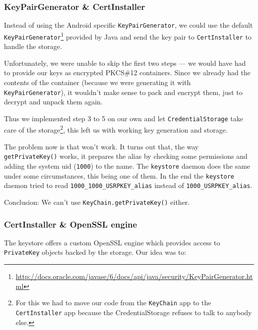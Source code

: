 \documentclass[a4paper]{scrartcl}
\begin{document}
		\subsubsection{KeyPairGenerator \& CertInstaller}
			Instead of using the Android specific \texttt{KeyPairGenerator}, we could use the default \texttt{KeyPairGenerator}\footnote{\url{http://docs.oracle.com/javase/6/docs/api/java/security/KeyPairGenerator.html}} provided by Java and send the key pair to \texttt{CertInstaller} to handle the storage.

			Unfortunately, we were unable to skip the first two steps --- we would have had to provide our keys as encrypted PKCS\#12 containers. Since we already had the contents of the container (because we were generating it with \texttt{KeyPairGenerator}), it wouldn't make sense to pack and encrypt them, just to decrypt and unpack them again.

			Thus we implemented step 3 to 5 on our own and let \texttt{CredentialStorage} take care of the storage\footnote{For this we had to move our code from the \texttt{KeyChain} app to the \texttt{CertInstaller} app because the CredentialStorage refuses to talk to anybody else.}, this left us with working key generation and storage.

			The problem now is that  won't work. It turns out that, the way \texttt{getPrivateKey()} works, it prepares the alias by checking some permissions and adding the system uid (\texttt{1000}) to the name. The \texttt{keystore} daemon does the same under some circumstances, this being one of them. In the end the \texttt{keystore} daemon tried to read \texttt{1000\_1000\_USRPKEY\_alias} instead of \texttt{1000\_USRPKEY\_alias}.

			Conclusion: We can't use \texttt{KeyChain.getPrivateKey()} either.

		\subsubsection{CertInstaller \& OpenSSL engine}
			The keystore offers a custom OpenSSL engine which provides access to \texttt{PrivateKey} objects backed by the storage. Our idea was to:
\end{document}
